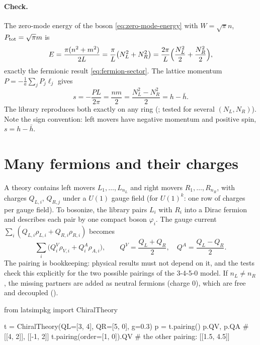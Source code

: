 \paragraph{Check.} The zero-mode energy of the boson \eqref{eq:zero-mode-energy} with $W = \sqrt\pi n$,
$P_{\rm tot} = \sqrt\pi m$ is
\begin{equation}
  E = \frac{\pi(n^2+m^2)}{2L} = \frac{\pi}{L}\bigl(N_L^2 + N_R^2\bigr) = \frac{2\pi}{L}\Bigl(\frac{N_L^2}{2}
  + \frac{N_R^2}{2}\Bigr),
\end{equation}
exactly the fermionic result \eqref{eq:fermion-sector}. The lattice momentum $P = -\frac1a\sum_j P_j\ell_j$
gives
\begin{equation}
  s = -\frac{PL}{2\pi} = \frac{nm}{2} = \frac{N_L^2 - N_R^2}{2} = h - \bar h .
\end{equation}
The library reproduces both exactly on any ring
(; tested for several $(N_L,N_R)$). Note the sign convention: left movers have
negative momentum and positive spin, $s = h - \bar h$.

\section{Many fermions and their charges}
A theory contains left movers $L_1,\dots,L_{n_L}$ and right movers $R_1,\dots,R_{n_R}$, with charges
$Q_{L,i}$, $Q_{R,j}$ under a $U(1)$ gauge field (for $U(1)^k$: one row of charges per gauge field). To bosonize,
the library pairs $L_i$ with $R_i$ into a Dirac fermion and describes each pair by one compact boson
$\varphi_i$. The gauge current $\sum_i (Q_{L,i}\rho_{L,i} + Q_{R,i}\rho_{R,i})$ becomes
\begin{equation}\label{eq:va-charges}
  \sum_i \bigl(Q^V_i \rho_{V,i} + Q^A_i \rho_{A,i}\bigr),\qquad
  Q^V = \frac{Q_L + Q_R}{2},\quad Q^A = \frac{Q_L - Q_R}{2}.
\end{equation}
The pairing is bookkeeping: physical results must not depend on it, and the tests check this explicitly for the
two possible pairings of the 3-4-5-0 model. If $n_L \neq n_R$, the missing partners are added as neutral fermions
(charge $0$), which are free and decoupled ().

\begin{python}
from latsimpkg import ChiralTheory

t = ChiralTheory(QL=[3, 4], QR=[5, 0], g=0.3)
p = t.pairing()
p.QV, p.QA          # [[4, 2]], [[-1, 2]]
t.pairing(order=[1, 0]).QV   # the other pairing: [[1.5, 4.5]]
\end{python}
